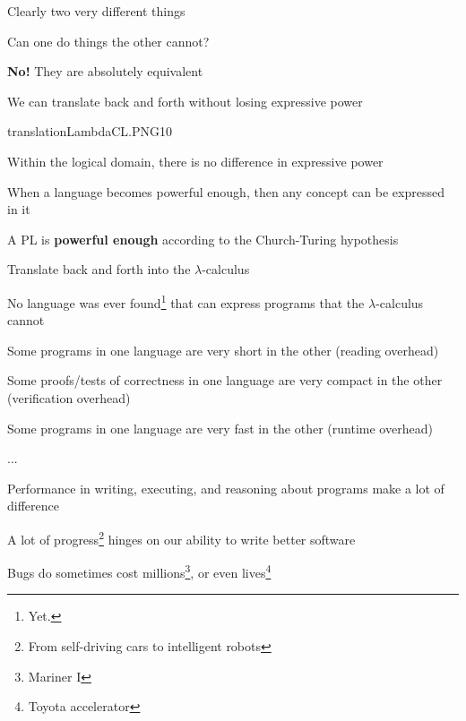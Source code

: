 \documentclass{beamer}
\begin{document}
\begin{slide}{
\item Clearly two very different things
\item Can one do things the other cannot?
\pause
\item \textbf{No!} They are absolutely equivalent
\item We can translate back and forth without losing expressive power
}\end{slide}

\begin{pictureSlide}{translationLambdaCL.PNG}{10}
\end{pictureSlide}

\begin{slide}{
\item Within the logical domain, there is no difference in expressive power
\item When a language becomes powerful enough, then any concept can be expressed in it
}\end{slide}

\begin{slide}{
\item A PL is \textbf{powerful enough} according to the Church-Turing hypothesis
\item Translate back and forth into the $\lambda$-calculus
\item No language was ever found\footnote{Yet.} that can express programs that the $\lambda$-calculus cannot
}\end{slide}

\begin{slide}{
\item Some programs in one language are very short in the other (reading overhead)
\item Some proofs/tests of correctness in one language are very compact in the other (verification overhead)
\item Some programs in one language are very fast in the other (runtime overhead)
\item ...
}\end{slide}

\begin{slide}{
\item Performance in writing, executing, and reasoning about programs make a lot of difference
\item A lot of progress\footnote{From self-driving cars to intelligent robots} hinges on our ability to write better software
\item Bugs do sometimes cost millions\footnote{Mariner I}, or even lives\footnote{Toyota accelerator}
}\end{slide}
\end{document}
